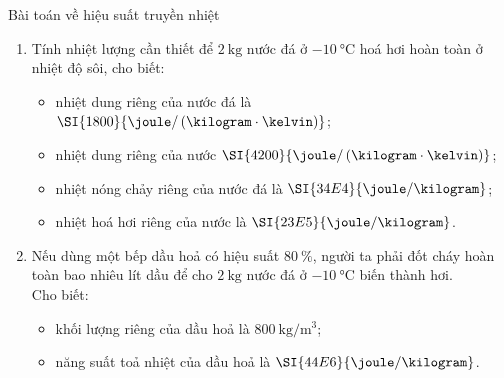\begin{dang}{Bài toán về hiệu suất truyền nhiệt}
{\begin{enumerate}[label=\alph*)]
		\item Tính nhiệt lượng cần thiết để $\SI{2}{\kilogram}$ nước đá ở $\SI{-10}{\celsius}$ hoá hơi hoàn toàn ở nhiệt độ sôi, cho biết:
		\begin{itemize}
			\item nhiệt dung riêng của nước đá là $\SI{1800}{\joule/\left(\kilogram\cdot\kelvin\right)}$;
			\item nhiệt dung riêng của nước $\SI{4200}{\joule/\left(\kilogram\cdot\kelvin\right)}$;
			\item nhiệt nóng chảy riêng của nước đá là $\SI{34E4}{\joule/\kilogram}$;
			\item nhiệt hoá hơi riêng của nước là $\SI{23E5}{\joule/\kilogram}$.
		\end{itemize}
	\item Nếu dùng một bếp dầu hoả có hiệu suất $\SI{80}{\percent}$, người ta phải đốt cháy hoàn toàn bao nhiêu lít dầu để cho $\SI{2}{\kilogram}$ nước đá ở $\SI{-10}{\celsius}$ biến thành hơi.\\
	Cho biết:
	\begin{itemize}
		\item khối lượng riêng của dầu hoả là $\SI{800}{\kilogram/\meter^3}$;
		\item năng suất toả nhiệt của dầu hoả là $\SI{44E6}{\joule/\kilogram}$.
	\end{itemize}
	\end{enumerate}

}
\end{dang}
